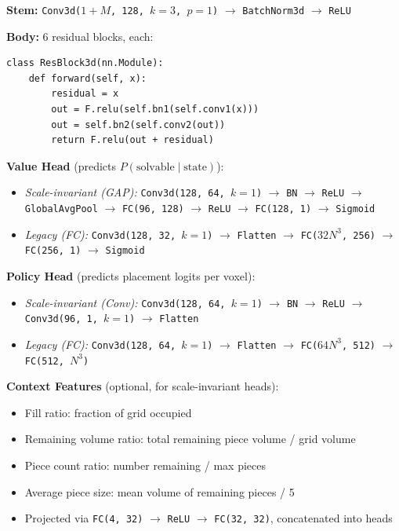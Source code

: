 \documentclass[11pt]{article}
\begin{document}
\textbf{Stem:} \texttt{Conv3d($1{+}M$, 128, $k{=}3$, $p{=}1$)} $\to$ \texttt{BatchNorm3d} $\to$ \texttt{ReLU}

\textbf{Body:} 6 residual blocks, each:
\begin{lstlisting}
class ResBlock3d(nn.Module):
    def forward(self, x):
        residual = x
        out = F.relu(self.bn1(self.conv1(x)))
        out = self.bn2(self.conv2(out))
        return F.relu(out + residual)
\end{lstlisting}

\textbf{Value Head} (predicts $P(\text{solvable} \mid \text{state})$):
\begin{itemize}[nosep]
  \item \textit{Scale-invariant (GAP):} \texttt{Conv3d(128, 64, $k{=}1$)} $\to$ \texttt{BN} $\to$ \texttt{ReLU} $\to$ \texttt{GlobalAvgPool} $\to$ \texttt{FC(96, 128)} $\to$ \texttt{ReLU} $\to$ \texttt{FC(128, 1)} $\to$ \texttt{Sigmoid}
  \item \textit{Legacy (FC):} \texttt{Conv3d(128, 32, $k{=}1$)} $\to$ \texttt{Flatten} $\to$ \texttt{FC($32N^3$, 256)} $\to$ \texttt{FC(256, 1)} $\to$ \texttt{Sigmoid}
\end{itemize}

\textbf{Policy Head} (predicts placement logits per voxel):
\begin{itemize}[nosep]
  \item \textit{Scale-invariant (Conv):} \texttt{Conv3d(128, 64, $k{=}1$)} $\to$ \texttt{BN} $\to$ \texttt{ReLU} $\to$ \texttt{Conv3d(96, 1, $k{=}1$)} $\to$ \texttt{Flatten}
  \item \textit{Legacy (FC):} \texttt{Conv3d(128, 64, $k{=}1$)} $\to$ \texttt{Flatten} $\to$ \texttt{FC($64N^3$, 512)} $\to$ \texttt{FC(512, $N^3$)}
\end{itemize}

\textbf{Context Features} (optional, for scale-invariant heads):
\begin{itemize}[nosep]
  \item Fill ratio: fraction of grid occupied
  \item Remaining volume ratio: total remaining piece volume / grid volume
  \item Piece count ratio: number remaining / max pieces
  \item Average piece size: mean volume of remaining pieces / 5
  \item Projected via \texttt{FC(4, 32)} $\to$ \texttt{ReLU} $\to$ \texttt{FC(32, 32)}, concatenated into heads
\end{itemize}
\end{document}
